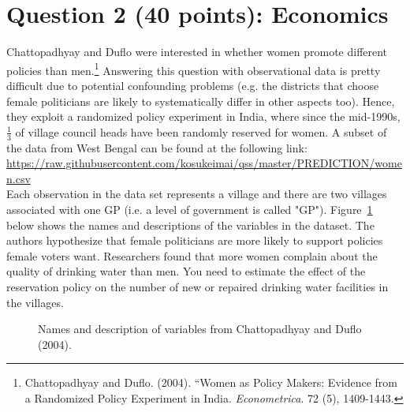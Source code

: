 \documentclass[12pt,letterpaper]{article}
\begin{document}
\section*{Question 2 (40 points): Economics}
Chattopadhyay and Duflo were interested in whether women promote different policies than men.\footnote{Chattopadhyay and Duflo. (2004). ``Women as Policy Makers: Evidence from a Randomized Policy Experiment in India. \textit{Econometrica}. 72 (5), 1409-1443.} Answering this question with observational data is pretty difficult due to potential confounding problems (e.g. the districts that choose female politicians are likely to systematically differ in other aspects too). Hence, they exploit a randomized policy experiment in India, where since the mid-1990s, $\frac{1}{3}$ of village council heads have been randomly reserved for women. A subset of the data from West Bengal can be found at the following link: \url{https://raw.githubusercontent.com/kosukeimai/qss/master/PREDICTION/women.csv}\\

\noindent Each observation in the data set represents a village and there are two villages associated with one GP (i.e. a level of government is called "GP"). Figure~\ref{fig:women_desc} below shows the names and descriptions of the variables in the dataset. The authors hypothesize that female politicians are more likely to support policies female voters want. Researchers found that more women complain about the quality of drinking water than men. You need to estimate the effect of the reservation policy on the number of new or repaired drinking water facilities in the villages.
\vspace{.5cm}
\begin{figure}[h!]
	\caption{\footnotesize{Names and description of variables from Chattopadhyay and Duflo (2004).}}
	\vspace{.5cm}
	\centering
	\label{fig:women_desc}
	
\end{figure}		
\end{document}
